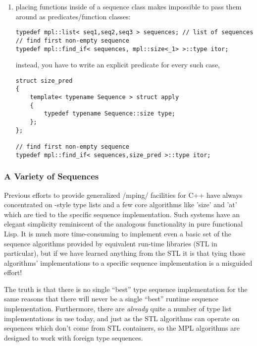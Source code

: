 \documentclass{kapproc}
\begin{document}
\begin{enumerate}
\item placing functions inside of a sequence class makes 
impossible to pass them around as predicates/function classes: 

{\small
\begin{codesamp}\begin{verbatim}
typedef mpl::list< seq1,seq2,seq3 > sequences; // list of sequences
// find first non-empty sequence
typedef mpl::find_if< sequences, mpl::size<_1> >::type itor;
\end{verbatim}
\end{codesamp}
}

instead, you have to write an explicit predicate for every such case, 

{\small
\begin{codesamp}\begin{verbatim}
struct size_pred
{
    template< typename Sequence > struct apply
    {
        typedef typename Sequence::size type;
    };
};

// find first non-empty sequence
typedef mpl::find_if< sequences,size_pred >::type itor;
\end{verbatim}
\end{codesamp}
}

\end{enumerate}

 
  \subsubsection{A Variety of Sequences}

Previous efforts to provide generalized /mping/ facilities for C++
have always concentrated on -style type lists and a few
core algorithms like 'size' and 'at' which are tied to the specific
sequence implementation. Such systems have an elegant simplicity
reminiscent of the analogous functionality in pure functional Lisp. It
is much more time-consuming to implement even a basic set of the
sequence algorithms provided by equivalent run-time libraries (STL in
particular), but if we have learned anything from the STL it is that
tying those algorithms' implementations to a specific sequence
implementation is a misguided effort!

The truth is that there is no single ``best'' type sequence
implementation for the same reasons that there will never be a single
``best'' runtime sequence implementation. Furthermore, there are
\emph{already} quite a number of type list implementations in use
today, and just as the STL algorithms can operate on sequences which
don't come from STL containers, so the MPL algorithms are designed to
work with foreign type sequences.
\end{document}

